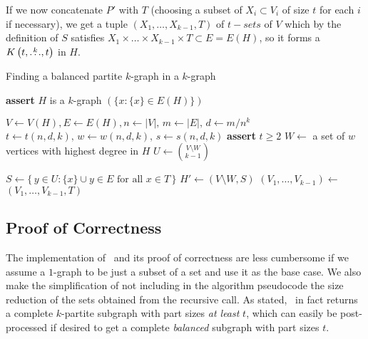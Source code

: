 If we now concatenate $P'$ with $T$ (choosing a subset of $X_i \subset V_i$ of size $t$ for each $i$ if necessary), we get
a tuple $(X_1, \dots, X_{k-1}, T)$ of $t-sets$ of $V$
which by the definition of $S$ satisfies
$X_1 \times \dots \times X_{k-1} \times T \subset E = E(H)$,
so it forms a $K\left(t, \overset{k}{\dots}, t\right)$ in $H$.

\begin{algorithm}[H]
    \caption{Finding a balanced partite $k$-graph in a $k$-graph}
    \label{alg:kpartite}
    \begin{algorithmic}[1]
            \State \textbf{assert} $H$ is a $k$-graph
             \label{line:base_case}
                \State \Return $(\{x \colon \{x\} \in E(H)\})$
            \EndIf

            \State $V \gets V(H), E \gets E(H), n \gets |V|,\, m \gets |E|,\, d \gets m/n^k$
            \State $t \gets t(n, d, k),\, w \gets w(n, d, k),\, s \gets s(n, d, k)$ \label{line:tws}
            \State \textbf{assert} $t \geq 2$ \label{line:min_t}
            \State $W \gets$ a set of $w$ vertices with highest degree in $H$ \label{line:W}
            \State $U \gets \binom{V\setminus W}{k-1}$

             \label{line:for}
                \State $S \gets \{\,y \in U \colon \{x\} \cup y \in E \text{ for all } x \in T\,\}$ \label{line:S}
                    \State $H' \gets (V \setminus W, S)$ \label{line:rec_call}
                    \State $(V_1, \dots, V_{k-1}) \gets$ 
                    \State \Return $(V_1, \dots, V_{k-1}, T)$ \label{line:return}
                \EndIf
            \EndFor
        \EndFunction
    \end{algorithmic}
\end{algorithm}

\subsection{Proof of Correctness} \label{subsec:proof-of-correctness}

The implementation of~ and its proof of correctness are less cumbersome if we assume
a $1$-graph to be just a subset of a set and use it as the base case.
We also make the simplification of not including in the algorithm pseudocode
the size reduction of the sets obtained from the recursive call.
As stated,~ in fact returns a complete $k$-partite
subgraph with part sizes \emph{at least} $t$, which can easily be post-processed
if desired to get a complete \emph{balanced} subgraph with part sizes $t$.

